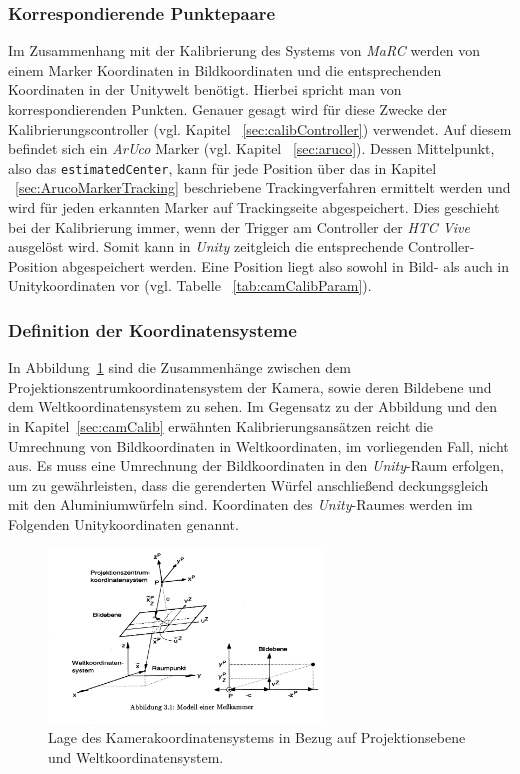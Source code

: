 \subsubsection{Korrespondierende Punktepaare} \label{sec:Korrespondenz} 
Im Zusammenhang mit der Kalibrierung des Systems von \textit{MaRC} werden von einem Marker Koordinaten in Bildkoordinaten und die entsprechenden Koordinaten in der Unitywelt benötigt. Hierbei spricht man von korrespondierenden Punkten. Genauer gesagt wird für diese Zwecke der Kalibrierungscontroller (vgl. Kapitel ~\ref{sec:calibController}) verwendet. Auf diesem befindet sich ein \textit{ArUco} Marker (vgl. Kapitel ~\ref{sec:aruco}). Dessen Mittelpunkt, also das \texttt{estimated\-Center}, kann für jede Position über das in Kapitel ~\ref{sec:ArucoMarkerTracking} beschriebene Trackingverfahren ermittelt werden und wird für jeden erkannten Marker auf Trackingseite abgespeichert. Dies geschieht bei der Kalibrierung immer, wenn der Trigger am Controller der \textit{HTC Vive} ausgelöst wird. Somit kann in \textit{Unity} zeitgleich die entsprechende Controller-Position abgespeichert werden. Eine Position liegt also sowohl in Bild- als auch in Unitykoordinaten vor (vgl. Tabelle ~\ref{tab:camCalibParam}).  

\subsubsection{Definition der Koordinatensysteme} \label{sec:DefKoords} 
In Abbildung~\ref{fig:cameraCalib} sind die Zusammenhänge zwischen dem Projektionszentrumkoordinatensystem der Kamera, sowie deren Bildebene und dem Weltkoordinatensystem zu sehen. Im Gegensatz zu der Abbildung und den in Kapitel~\ref{sec:camCalib} erwähnten Kalibrierungsansätzen reicht die Umrechnung von Bildkoordinaten in Weltkoordinaten, im vorliegenden Fall, nicht aus. Es muss eine Umrechnung der Bildkoordinaten in den \textit{Unity}-Raum erfolgen, um zu gewährleisten, dass die gerenderten Würfel anschließend deckungsgleich mit den Aluminiumwürfeln sind. Koordinaten des \textit{Unity}-Raumes werden im Folgenden Unitykoordinaten genannt.\\

\begin{figure}[H]
		\centering
		\includegraphics[width=0.65\textwidth , trim = 0mm 65mm 270mm 0mm, clip]{Bilder/cameraCalib.jpg}
			\caption{Lage des Kamerakoordinatensystems in Bezug auf Projektionsebene und Weltkoordinatensystem. \cite{Meisel:77890}}
			\label{fig:cameraCalib}
	\end{figure}


